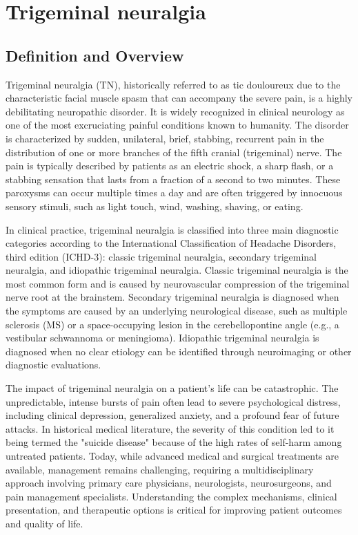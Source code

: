 \chapter{Trigeminal neuralgia}

\section*{Definition and Overview}
Trigeminal neuralgia (TN), historically referred to as tic douloureux due to the characteristic facial muscle spasm that can accompany the severe pain, is a highly debilitating neuropathic disorder. It is widely recognized in clinical neurology as one of the most excruciating painful conditions known to humanity. The disorder is characterized by sudden, unilateral, brief, stabbing, recurrent pain in the distribution of one or more branches of the fifth cranial (trigeminal) nerve. The pain is typically described by patients as an electric shock, a sharp flash, or a stabbing sensation that lasts from a fraction of a second to two minutes. These paroxysms can occur multiple times a day and are often triggered by innocuous sensory stimuli, such as light touch, wind, washing, shaving, or eating.

In clinical practice, trigeminal neuralgia is classified into three main diagnostic categories according to the International Classification of Headache Disorders, third edition (ICHD-3): classic trigeminal neuralgia, secondary trigeminal neuralgia, and idiopathic trigeminal neuralgia. Classic trigeminal neuralgia is the most common form and is caused by neurovascular compression of the trigeminal nerve root at the brainstem. Secondary trigeminal neuralgia is diagnosed when the symptoms are caused by an underlying neurological disease, such as multiple sclerosis (MS) or a space-occupying lesion in the cerebellopontine angle (e.g., a vestibular schwannoma or meningioma). Idiopathic trigeminal neuralgia is diagnosed when no clear etiology can be identified through neuroimaging or other diagnostic evaluations.

The impact of trigeminal neuralgia on a patient's life can be catastrophic. The unpredictable, intense bursts of pain often lead to severe psychological distress, including clinical depression, generalized anxiety, and a profound fear of future attacks. In historical medical literature, the severity of this condition led to it being termed the "suicide disease" because of the high rates of self-harm among untreated patients. Today, while advanced medical and surgical treatments are available, management remains challenging, requiring a multidisciplinary approach involving primary care physicians, neurologists, neurosurgeons, and pain management specialists. Understanding the complex mechanisms, clinical presentation, and therapeutic options is critical for improving patient outcomes and quality of life.


